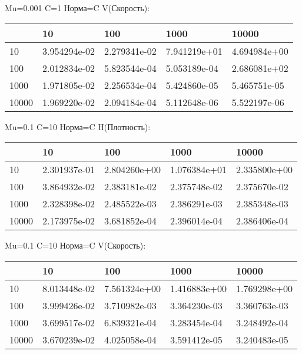 \documentclass[a4paper, 12pt]{article}
\begin{document}
\bigskip
\bigskip
\bigskip


Mu=0.001  C=1 Норма=C V(Скорость):


\begin{tabular}{lllll}
\toprule
{} &         10    &         100   &         1000  &         10000 \\
\midrule
10    &  3.954294e-02 &  2.279341e-02 &  7.941219e+01 &  4.694984e+00 \\
100   &  2.012834e-02 &  5.823544e-04 &  5.053189e-04 &  2.686081e+02 \\
1000  &  1.971805e-02 &  2.256534e-04 &  5.424860e-05 &  5.465751e-05 \\
10000 &  1.969220e-02 &  2.094184e-04 &  5.112648e-06 &  5.522197e-06 \\
\bottomrule
\end{tabular}



\bigskip
\bigskip
\bigskip


Mu=0.1  C=10 Норма=C H(Плотность):


\begin{tabular}{lllll}
\toprule
{} &         10    &         100   &         1000  &         10000 \\
\midrule
10    &  2.301937e-01 &  2.804260e+00 &  1.076384e+01 &  2.335800e+00 \\
100   &  3.864932e-02 &  2.383181e-02 &  2.375748e-02 &  2.375670e-02 \\
1000  &  2.328398e-02 &  2.485522e-03 &  2.386291e-03 &  2.385348e-03 \\
10000 &  2.173975e-02 &  3.681852e-04 &  2.396014e-04 &  2.386406e-04 \\
\bottomrule
\end{tabular}



\bigskip
\bigskip
\bigskip


Mu=0.1  C=10 Норма=C V(Скорость):


\begin{tabular}{lllll}
\toprule
{} &         10    &         100   &         1000  &         10000 \\
\midrule
10    &  8.013448e-02 &  7.561324e+00 &  1.416883e+00 &  1.769298e+00 \\
100   &  3.999426e-02 &  3.710982e-03 &  3.364230e-03 &  3.360763e-03 \\
1000  &  3.699517e-02 &  6.839321e-04 &  3.283454e-04 &  3.248492e-04 \\
10000 &  3.670239e-02 &  4.025058e-04 &  3.591412e-05 &  3.240483e-05 \\
\bottomrule
\end{tabular}
\end{document}
